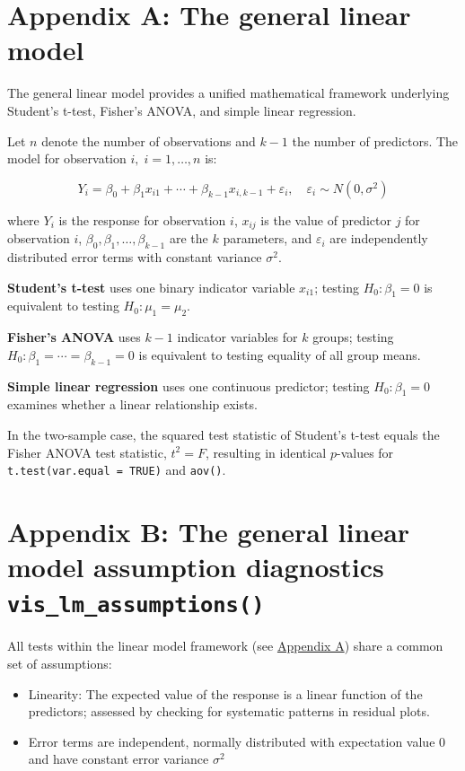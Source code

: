 \section{Appendix A: The general linear model}\label{glm}

The general linear model \citep{Searle:1971} provides a unified mathematical framework underlying Student's t-test, Fisher's ANOVA, and simple linear regression.

Let \(n\) denote the number of observations and \(k-1\) the number of predictors.
The model for observation \(i,\;i = 1, \ldots, n\) is:

\[Y_i = \beta_0 + \beta_1 x_{i1} + \cdots + \beta_{k-1} x_{i,k-1} + \varepsilon_i, \quad \varepsilon_i \sim N(0, \sigma^2)\]

where \(Y_i\) is the response for observation \(i\), \(x_{ij}\) is the value of predictor \(j\) for observation \(i\), \(\beta_0, \beta_1, \ldots, \beta_{k-1}\) are the \(k\) parameters, and \(\varepsilon_i\) are independently distributed error terms with constant variance \(\sigma^2\).

\textbf{Student's t-test} uses one binary indicator variable \(x_{i1}\);
testing \(H_0: \beta_1 = 0\) is equivalent to testing
\(H_0: \mu_1 = \mu_2\).

\textbf{Fisher's ANOVA} uses \(k-1\) indicator variables for \(k\) groups;
testing \(H_0: \beta_1 = \cdots = \beta_{k-1} = 0\) is equivalent to
testing equality of all group means.

\textbf{Simple linear regression} uses one continuous predictor; testing
\(H_0: \beta_1 = 0\) examines whether a linear relationship exists.

In the two-sample case, the squared test statistic of Student's t-test
equals the Fisher ANOVA test statistic, \(t^2 = F\),
resulting in identical
\(p\)-values for \texttt{t.test(var.equal\ =\ TRUE)} and \texttt{aov()}.

\section{\texorpdfstring{Appendix B: The general linear model assumption diagnostics \texttt{vis\_lm\_assumptions()}}{Appendix B: The general linear model assumption diagnostics vis\_lm\_assumptions()}}\label{assumptions}

All tests within the linear model framework (see \hyperref[glm]{Appendix A}) share a common set of assumptions:

\begin{itemize}
\item
  Linearity: The expected value of the response is a linear function of the predictors; assessed by checking for systematic patterns in residual plots.
\item
  Error terms are independent, normally distributed with expectation value 0 and have constant error variance \(\sigma^2\)
\end{itemize}

